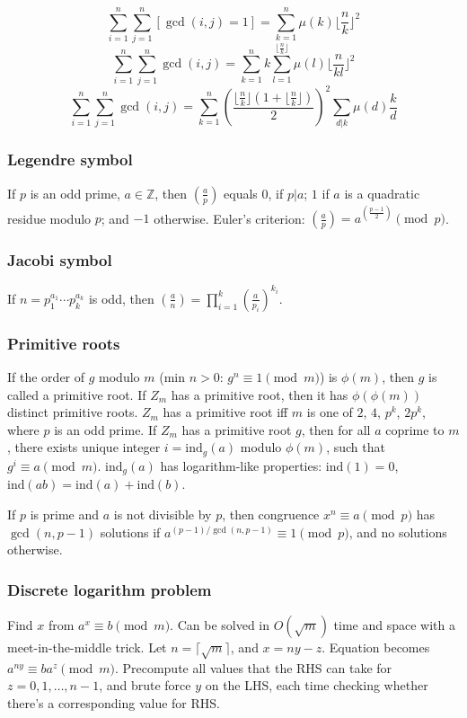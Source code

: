 \[ \sum_{i = 1}^n \sum_{j = 1}^n [\gcd(i, j) = 1] = \sum_{k = 1}^n \mu(k) \lfloor \frac{n}{k} \rfloor^2 \]
\[ \sum_{i = 1}^n \sum_{j = 1}^n \gcd(i, j) = \sum_{k = 1}^n k \sum_{l = 1}^{\lfloor \frac{n}{k} \rfloor} \mu(l) \lfloor {\frac{n}{kl}} \rfloor^2 \]
\[ \sum_{i = 1}^n \sum_{j = 1}^n \gcd(i, j) = \sum_{k = 1}^n \left(\frac{\lfloor \frac{n}{k} \rfloor (1 + \lfloor \frac{n}{k} \rfloor)}{2}\right)^2 \sum_{d | k} \mu(d) \frac{k}{d} \]

\subsubsection{Legendre symbol}
If $p$ is an odd prime, $a \in {\mathbb Z}$, then
$\left(\frac{a}{p}\right)$ equals $0$, if $p | a$; $1$ if $a$ is a quadratic
residue modulo $p$; and $-1$ otherwise.
Euler's criterion:
$\left(\frac{a}{p}\right)=a^{\left(\frac{p-1}{2}\right)} \pmod p$.

\subsubsection{Jacobi symbol}
If $n=p_1^{a_1} \cdots p_k^{a_k}$ is odd, then
$\left(\frac{a}{n}\right) = \prod_{i=1}^k \left(\frac{a}{p_i}\right)^{k_i}$.

\subsubsection{Primitive roots}
If the order of $g$ modulo $m$ (min $n>0$:
$g^n \equiv 1 \pmod{m}$) is $\phi(m)$, then $g$ is called a primitive root.
If $Z_m$ has a primitive root, then it has $\phi(\phi(m))$ distinct primitive
roots. $Z_m$ has a primitive root iff $m$ is one of $2$, $4$,
$p^k$, $2p^k$, where $p$ is an odd prime.
If $Z_m$ has a primitive root $g$, then for all $a$ coprime to $m$,
there exists unique integer $i=\text{ind}_g(a)$ modulo $\phi(m)$,
such that $g^i \equiv a \pmod{m}$.
$\text{ind}_g(a)$ has logarithm-like properties:
$\text{ind}(1) = 0$, $\text{ind}(ab) = \text{ind}(a) + \text{ind}(b)$.

If $p$ is prime and $a$ is not divisible by $p$, then congruence
$x^n \equiv a \pmod{p}$ has $\gcd(n, p-1)$ solutions if
$a^{(p-1)/\gcd(n,p-1)} \equiv 1 \pmod{p}$, and no solutions otherwise.

\subsubsection{Discrete logarithm problem}
Find $x$ from $a^x \equiv b \pmod{m}$.
Can be solved in $O(\sqrt{m})$ time and space with a meet-in-the-middle trick.
Let $n = \lceil \sqrt{m} \rceil$, and $x = ny - z$.
Equation becomes $a^{ny} \equiv b a^z \pmod{m}$.  Precompute all values that
the RHS can take for $z = 0, 1, \dots, n-1$, and brute force $y$ on the LHS,
each time checking whether there's a corresponding value for RHS.

